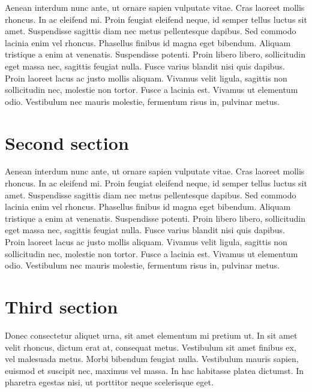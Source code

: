 \documentclass[10pt,a4paper,twoside,twocolumn]{article}
\begin{document}
Aenean interdum nunc ante, ut ornare sapien vulputate vitae. Cras laoreet mollis rhoncus. In ac eleifend mi. Proin feugiat eleifend neque, id semper tellus luctus sit amet. Suspendisse sagittis diam nec metus pellentesque dapibus. Sed commodo lacinia enim vel rhoncus. Phasellus finibus id magna eget bibendum. Aliquam tristique a enim at venenatis. Suspendisse potenti. Proin libero libero, sollicitudin eget massa nec, sagittis feugiat nulla. Fusce varius blandit nisi quis dapibus. Proin laoreet lacus ac justo mollis aliquam. Vivamus velit ligula, sagittis non sollicitudin nec, molestie non tortor. Fusce a lacinia est. Vivamus ut elementum odio. Vestibulum nec mauris molestie, fermentum risus in, pulvinar metus.

\section{Second section}

Aenean interdum nunc ante, ut ornare sapien vulputate vitae. Cras laoreet mollis rhoncus. In ac eleifend mi. Proin feugiat eleifend neque, id semper tellus luctus sit amet. Suspendisse sagittis diam nec metus pellentesque dapibus. Sed commodo lacinia enim vel rhoncus. Phasellus finibus id magna eget bibendum. Aliquam tristique a enim at venenatis. Suspendisse potenti. Proin libero libero, sollicitudin eget massa nec, sagittis feugiat nulla. Fusce varius blandit nisi quis dapibus. Proin laoreet lacus ac justo mollis aliquam. Vivamus velit ligula, sagittis non sollicitudin nec, molestie non tortor. Fusce a lacinia est. Vivamus ut elementum odio. Vestibulum nec mauris molestie, fermentum risus in, pulvinar metus.



\section{Third section}

Donec consectetur aliquet urna, sit amet elementum mi pretium ut. In sit amet velit rhoncus, dictum erat at, consequat metus. Vestibulum sit amet finibus ex, vel malesuada metus. Morbi bibendum feugiat nulla. Vestibulum mauris sapien, euismod et suscipit nec, maximus vel massa. In hac habitasse platea dictumst. In pharetra egestas nisi, ut porttitor neque scelerisque eget.
\end{document}
